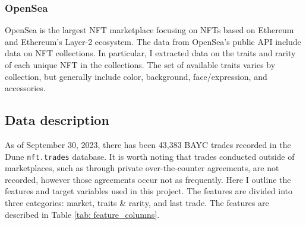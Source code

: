 \documentclass[12pt]{article}
\begin{document}
\subsubsection{OpenSea}
OpenSea is the largest NFT marketplace focusing on NFTs based on Ethereum and Ethereum's Layer-2 ecosystem. The data from OpenSea's public API include data on NFT collections. In particular, I extracted data on the traits and rarity of each unique NFT in the collections. The set of available traits varies by collection, but generally include color, background, face/expression, and accessories.

\subsection{Data description}
As of September 30, 2023, there has been 43,383 BAYC trades recorded in the Dune \texttt{nft.trades} database. It is worth noting that trades conducted outside of marketplaces, such as through private over-the-counter agreements, are not recorded, however those agreements occur not as frequently. Here I outline the features and target variables used in this project. The features are divided into three categories: market, traits \& rarity, and last trade. The features are described in Table \ref{tab: feature_columns}.
\end{document}

